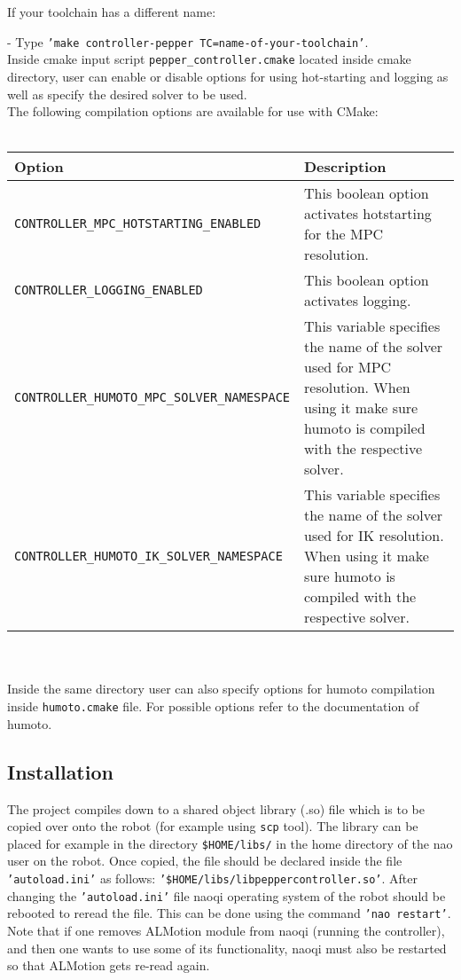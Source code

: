 \noindent If your toolchain has a different name:

- Type \texttt{'make controller-pepper TC=name-of-your-toolchain'}.\\

\noindent Inside cmake input script \texttt{pepper\_controller.cmake} located inside cmake directory, user can enable or disable
options for using hot-starting and logging as well as specify the desired solver to be used.\\

\noindent The following compilation options are available for use with CMake:\\ \\
\begin{tabular}{|l|p{5cm}|}
\hline
Option & Description \\
\hline
\texttt{CONTROLLER\_MPC\_HOTSTARTING\_ENABLED} & This boolean option activates hotstarting for the MPC resolution.\\
\hline
\texttt{CONTROLLER\_LOGGING\_ENABLED} & This boolean option activates logging.\\ \hline
\texttt{CONTROLLER\_HUMOTO\_MPC\_SOLVER\_NAMESPACE} & This variable specifies the name of the solver used for
MPC resolution. When using it make sure humoto is compiled with the respective solver. \\ \hline
\texttt{CONTROLLER\_HUMOTO\_IK\_SOLVER\_NAMESPACE} & This variable specifies the name of the solver used for IK
resolution. When using it make sure humoto is compiled with the respective solver.\\ 
\hline
\end{tabular} \\ \\

\noindent Inside the same directory user can also specify options for humoto compilation inside \texttt{humoto.cmake} file.
For possible options refer to the documentation of humoto.

\subsection{Installation}
\noindent The project compiles down to a shared object library (.so) file which is to be copied over onto the robot (for example
using \texttt{scp} tool). The library can be placed for example in the directory \texttt{\$HOME/libs/} in the home directory of the nao user on the
robot. Once copied, the file should be declared inside the file \texttt{'autoload.ini'} as follows:
\texttt{'\$HOME/libs/libpeppercontroller.so'}. After changing the \texttt{'autoload.ini'} file naoqi operating system of the robot should be
rebooted to reread the file. This can be done using the command \texttt{'nao restart'}. Note that if one removes ALMotion
module from naoqi (running the controller), and then one wants to use some of its functionality, naoqi must also be
restarted so that ALMotion gets re-read again.\\ 

